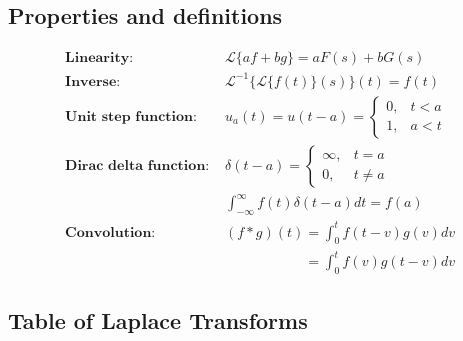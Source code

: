 \documentclass[10pt,leqno]{article}
\begin{document}
\begin{multicols}{2}

\subsection*{Properties and definitions}
\begin{align}
    \textbf{Linearity:\ }& \mathcal{L}\{af+bg\}=aF(s)+bG(s) \\ 
    \textbf{Inverse:\ }& \mathcal{L}^{-1}\{\mathcal{L}\{f(t)\}(s)\}(t)=f(t) \\
    \textbf{Unit step function:\ }& u_{a}(t)=u(t-a)=\left\{
        \begin{array}{ll}
            0, & t<a \\
            1, & a<t
        \end{array} \right. \\
    \textbf{Dirac delta function:\ }& \delta(t-a) = 
    \begin{cases}
        \infty, & t = a \\ 
        0 , & t \neq a
    \end{cases} \\
    & \int_{-\infty}^{\infty} f(t) \delta(t-a) d t = f(a) \\
    \textbf{Convolution:\ }& (f*g)(t)=\int_{0}^{t}f(t-v)g(v)dv \\
    & \phantom{(f*g)(t)}=\int_{0}^{t}f(v)g(t-v)dv \nonumber
\end{align}

\subsection*{Table of Laplace Transforms}


\end{multicols}
\end{document}
